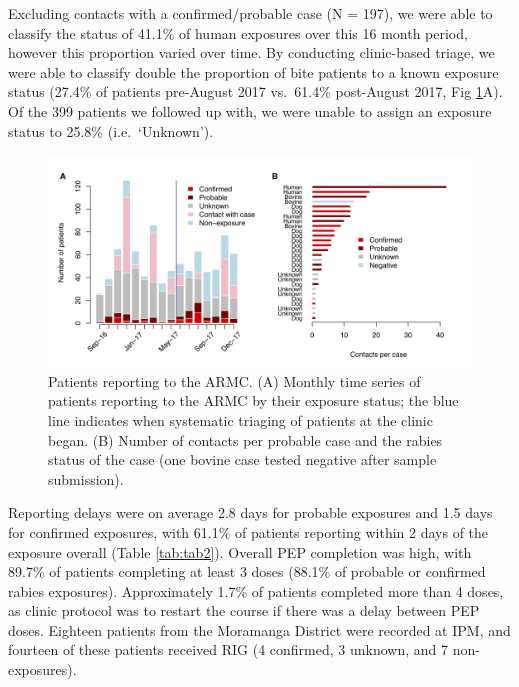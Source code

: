\documentclass[
  oneside]{book}
\begin{document}
Excluding contacts with a confirmed/probable case (N = 197), we were able to classify the status of 41.1\% of human exposures over this 16 month period, however this proportion varied over time. By conducting clinic-based triage, we were able to classify double the proportion of bite patients to a known exposure status (27.4\% of patients pre-August 2017 vs.~61.4\% post-August 2017, Fig \ref{fig:fig4}A). Of the 399 patients we followed up with, we were unable to assign an exposure status to 25.8\% (i.e.~`Unknown').

\begin{figure}
\includegraphics[width=0.95\linewidth]{figs/ch1/fig4} \caption[Time series of patients reporting to the ARMC and clustering of Category I contacts.]{Patients reporting to the ARMC. (A) Monthly time series of patients reporting to the ARMC by their exposure status; the blue line indicates when systematic triaging of patients at the clinic began. (B) Number of contacts per probable case and the rabies status of the case (one bovine case tested negative after sample submission).}\label{fig:fig4}
\end{figure}



Reporting delays were on average 2.8 days for probable exposures and 1.5 days for confirmed exposures, with 61.1\% of patients reporting within 2 days of the exposure overall (Table \ref{tab:tab2}). Overall PEP completion was high, with 89.7\% of patients completing at least 3 doses (88.1\% of probable or confirmed rabies exposures). Approximately 1.7\% of patients completed more than 4 doses, as clinic protocol was to restart the course if there was a delay between PEP doses. Eighteen patients from the Moramanga District were recorded at IPM, and fourteen of these patients received RIG (4 confirmed, 3 unknown, and 7 non-exposures).
\end{document}
